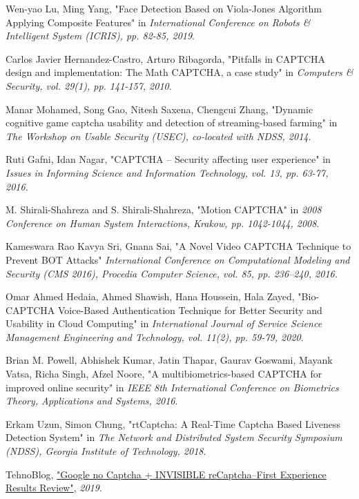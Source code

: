 \begin{thebibliography}{9}
Wen-yao Lu, Ming Yang, "Face Detection Based on Viola-Jones Algorithm Applying Composite Features" in \emph{International Conference on Robots \& Intelligent System (ICRIS), pp. 82-85, 2019}.

Carlos Javier Hernandez-Castro, Arturo Ribagorda, "Pitfalls in CAPTCHA design and implementation: The Math CAPTCHA, a case study" in \emph{Computers \& Security, vol. 29(1), pp. 141-157, 2010}.

Manar Mohamed, Song Gao, Nitesh Saxena, Chengcui Zhang,  "Dynamic cognitive  game  captcha  usability  and  detection  of  streaming-based  farming" in \emph{The Workshop on Usable Security (USEC), co-located with NDSS, 2014}.

Ruti Gafni, Idan Nagar, "CAPTCHA – Security affecting user experience" in \emph{Issues in Informing Science and Information Technology, vol. 13, pp. 63-77, 2016.}

M. Shirali-Shahreza and S. Shirali-Shahreza, "Motion CAPTCHA" in \emph{2008 Conference on Human System Interactions, Krakow, pp. 1042-1044, 2008}.

Kameswara Rao Kavya Sri, Gnana Sai, "A Novel Video CAPTCHA Technique to Prevent BOT Attacks" \emph{International Conference on Computational Modeling and  Security (CMS 2016), Procedia Computer  Science, vol. 85, pp. 236–240, 2016.}

Omar Ahmed Hedaia, Ahmed Shawish, Hana Houssein, Hala Zayed, "Bio-CAPTCHA Voice-Based Authentication Technique for Better Security and Usability in Cloud Computing" in \emph{International Journal of Service Science Management Engineering and Technology, vol. 11(2), pp. 59-79, 2020}.

Brian M. Powell, Abhishek Kumar, Jatin Thapar, Gaurav Goswami, Mayank Vatsa, Richa Singh, Afzel Noore, "A multibiometrics-based CAPTCHA for improved online security" in \emph{IEEE 8th International Conference on Biometrics Theory, Applications and Systems, 2016}.

Erkam Uzun, Simon Chung, "rtCaptcha: A Real-Time Captcha Based Liveness Detection System" in \emph{The Network and Distributed System Security Symposium (NDSS), Georgia Institute of Technology, 2018}.

TehnoBlog, \href{https://tehnoblog.org/google-no-captcha-invisible-recaptcha-first-experience-results-review/}{"Google no Captcha + INVISIBLE reCaptcha–First Experience Results Review"}, \emph{2019}.


\end{thebibliography}

